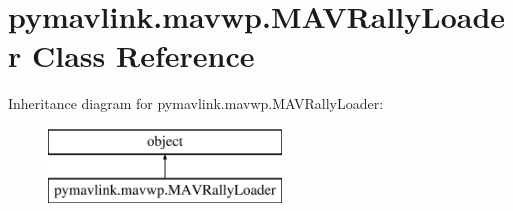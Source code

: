 \hypertarget{classpymavlink_1_1mavwp_1_1MAVRallyLoader}{}\section{pymavlink.\+mavwp.\+M\+A\+V\+Rally\+Loader Class Reference}
\label{classpymavlink_1_1mavwp_1_1MAVRallyLoader}
Inheritance diagram for pymavlink.\+mavwp.\+M\+A\+V\+Rally\+Loader\+:\begin{figure}[H]
\begin{center}
\leavevmode
\includegraphics[height=2.000000cm]{classpymavlink_1_1mavwp_1_1MAVRallyLoader}
\end{center}
\end{figure}

